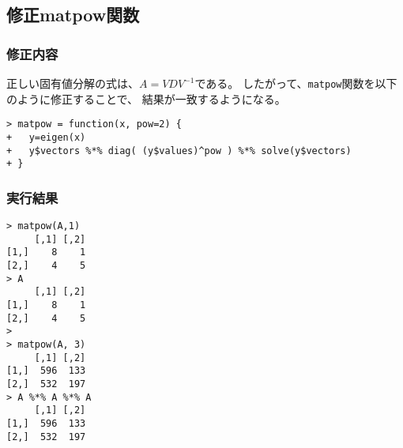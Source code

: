 \documentclass{jsarticle}
\begin{document}
\subsection*{修正matpow関数}
\subsubsection*{修正内容}
正しい固有値分解の式は、$A = VDV^{-1}$である。
したがって、\verb|matpow|関数を以下のように修正することで、
結果が一致するようになる。
\begin{lstlisting}[basicstyle=\ttfamily\footnotesize, frame=single]
> matpow = function(x, pow=2) {
+   y=eigen(x)
+   y$vectors %*% diag( (y$values)^pow ) %*% solve(y$vectors)
+ }
\end{lstlisting}

\subsubsection*{実行結果}
\begin{lstlisting}[basicstyle=\ttfamily\footnotesize, frame=single]
> matpow(A,1)
     [,1] [,2]
[1,]    8    1
[2,]    4    5
> A
     [,1] [,2]
[1,]    8    1
[2,]    4    5
>
> matpow(A, 3)
     [,1] [,2]
[1,]  596  133
[2,]  532  197
> A %*% A %*% A
     [,1] [,2]
[1,]  596  133
[2,]  532  197
\end{lstlisting}
\end{document}
